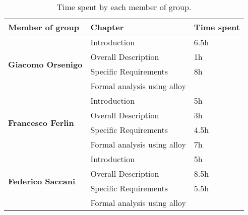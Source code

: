 \begin{table}[H]
      \centering
      \begin{tabular}{|l|l|l|}
            \hline
            \textbf{Member of group }                  & \textbf{Chapter}            & \textbf{Time spent} \\\hline
            \multirow{4}{*}{\textbf{Giacomo Orsenigo}} & Introduction                & 6.5h                \\
                                                       & Overall Description         & 1h                  \\
                                                       & Specific Requirements       & 8h                  \\
                                                       & Formal analysis using alloy &                     \\\hline
            \multirow{4}{*}{\textbf{Francesco Ferlin}} & Introduction                & 5h                  \\
                                                       & Overall Description         & 3h                  \\
                                                       & Specific Requirements       & 4.5h                \\
                                                       & Formal analysis using alloy & 7h                  \\\hline
            \multirow{4}{*}{\textbf{Federico Saccani}} & Introduction                & 5h                  \\
                                                       & Overall Description         & 8.5h                \\
                                                       & Specific Requirements       & 5.5h                \\
                                                       & Formal analysis using alloy &                     \\\hline
      \end{tabular}
      \caption{Time spent by each member of group.}
      \label{table:Time spent}
\end{table}
